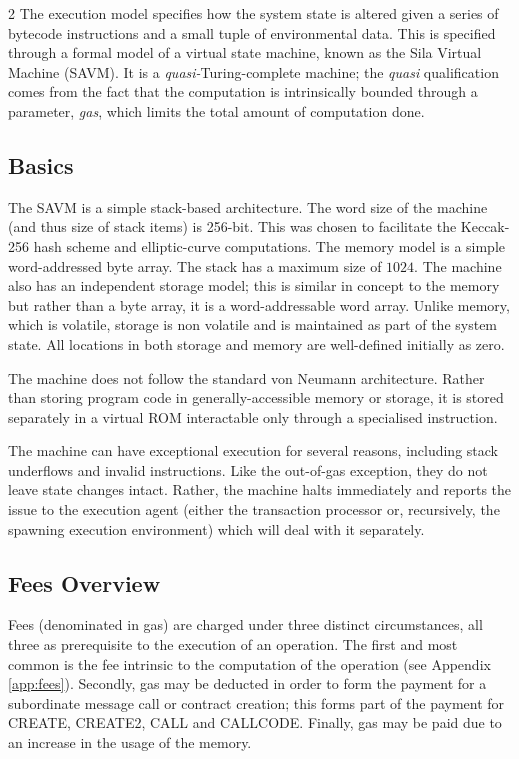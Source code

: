 \documentclass[9pt,oneside]{amsart}
\begin{document}
\begin{multicols}{2}
The execution model specifies how the system state is altered given a series of bytecode instructions and a small tuple of environmental data. This is specified through a formal model of a virtual state machine, known as the Sila Virtual Machine (SAVM). It is a \textit{quasi-}Turing-complete machine; the \textit{quasi} qualification comes from the fact that the computation is intrinsically bounded through a parameter, \textit{gas}, which limits the total amount of computation done.

\subsection{Basics}

The SAVM is a simple stack-based architecture. The word size of the machine (and thus size of stack items) is 256-bit. This was chosen to facilitate the Keccak-256 hash scheme and elliptic-curve computations. The memory model is a simple word-addressed byte array. The stack has a maximum size of $1024$. The machine also has an independent storage model; this is similar in concept to the memory but rather than a byte array, it is a word-addressable word array. Unlike memory, which is volatile, storage is non volatile and is maintained as part of the system state. All locations in both storage and memory are well-defined initially as zero.

The machine does not follow the standard von Neumann architecture. Rather than storing program code in generally-accessible memory or storage, it is stored separately in a virtual ROM interactable only through a specialised instruction.

The machine can have exceptional execution for several reasons, including stack underflows and invalid instructions. Like the out-of-gas exception, they do not leave state changes intact. Rather, the machine halts immediately and reports the issue to the execution agent (either the transaction processor or, recursively, the spawning execution environment) which will deal with it separately.

\subsection{Fees Overview}

Fees (denominated in gas) are charged under three distinct circumstances, all three as prerequisite to the execution of an operation. The first and most common is the fee intrinsic to the computation of the operation (see Appendix \ref{app:fees}). Secondly, gas may be deducted in order to form the payment for a subordinate message call or contract creation; this forms part of the payment for {\small CREATE}, {\small CREATE2}, {\small CALL} and {\small CALLCODE}. Finally, gas may be paid due to an increase in the usage of the memory.


\end{multicols}
\end{document}
